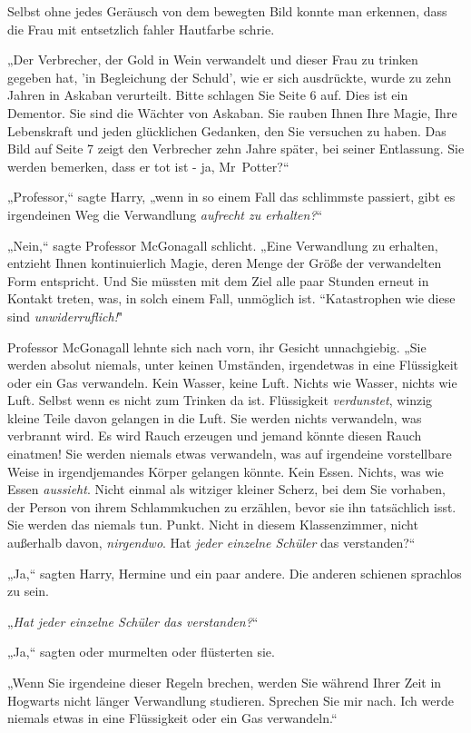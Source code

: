{Selbst ohne jedes Geräusch von dem bewegten Bild konnte man erkennen, dass die Frau mit entsetzlich fahler Hautfarbe schrie.

„Der Verbrecher, der Gold in Wein verwandelt und dieser Frau zu trinken gegeben hat, 'in Begleichung der Schuld', wie er sich ausdrückte, wurde zu zehn Jahren in Askaban verurteilt. Bitte schlagen Sie Seite 6 auf. Dies ist ein Dementor. Sie sind die Wächter von Askaban. Sie rauben Ihnen Ihre Magie, Ihre Lebenskraft und jeden glücklichen Gedanken, den Sie versuchen zu haben. Das Bild auf Seite 7 zeigt den Verbrecher zehn Jahre später, bei seiner Entlassung. Sie werden bemerken, dass er tot ist - ja, Mr~Potter?“

„Professor,“ sagte Harry, „wenn in so einem Fall das schlimmste passiert, gibt es irgendeinen Weg die Verwandlung \emph{aufrecht zu erhalten?}“

„Nein,“ sagte Professor McGonagall schlicht. „Eine Verwandlung zu erhalten, entzieht Ihnen kontinuierlich Magie, deren Menge der Größe der verwandelten Form entspricht. Und Sie müssten mit dem Ziel alle paar Stunden erneut in Kontakt treten, was, in solch einem Fall, unmöglich ist. “Katastrophen wie diese sind \emph{unwiderruflich!}"

Professor McGonagall lehnte sich nach vorn, ihr Gesicht unnachgiebig. „Sie werden absolut niemals, unter keinen Umständen, irgendetwas in eine Flüssigkeit oder ein Gas verwandeln. Kein Wasser, keine Luft. Nichts wie Wasser, nichts wie Luft. Selbst wenn es nicht zum Trinken da ist. Flüssigkeit \emph{verdunstet}, winzig kleine Teile davon gelangen in die Luft. Sie werden nichts verwandeln, was verbrannt wird. Es wird Rauch erzeugen und jemand könnte diesen Rauch einatmen! Sie werden niemals etwas verwandeln, was auf irgendeine vorstellbare Weise in irgendjemandes Körper gelangen könnte. Kein Essen. Nichts, was wie Essen \emph{aussieht}. Nicht einmal als witziger kleiner Scherz, bei dem Sie vorhaben, der Person von ihrem Schlammkuchen zu erzählen, bevor sie ihn tatsächlich isst. Sie werden das niemals tun. Punkt. Nicht in diesem Klassenzimmer, nicht außerhalb davon, \emph{nirgendwo}. Hat \emph{jeder einzelne Schüler} das verstanden?“

„Ja,“ sagten Harry, Hermine und ein paar andere. Die anderen schienen sprachlos zu sein.

„\emph{Hat jeder einzelne Schüler das verstanden?}“

„Ja,“ sagten oder murmelten oder flüsterten sie.

„Wenn Sie irgendeine dieser Regeln brechen, werden Sie während Ihrer Zeit in Hogwarts nicht länger Verwandlung studieren. Sprechen Sie mir nach. Ich werde niemals etwas in eine Flüssigkeit oder ein Gas verwandeln.“

}
